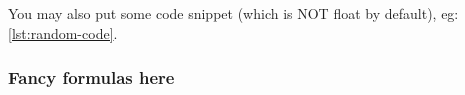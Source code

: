 \documentclass[12pt,a4paper,openright,twoside]{book}
\begin{document}
You may also put some code snippet (which is NOT float by default), eg: \cref{lst:random-code}.



\section{Fancy formulas here}


\backmatter

\part*{}

\nocite{*} %


\end{document}
